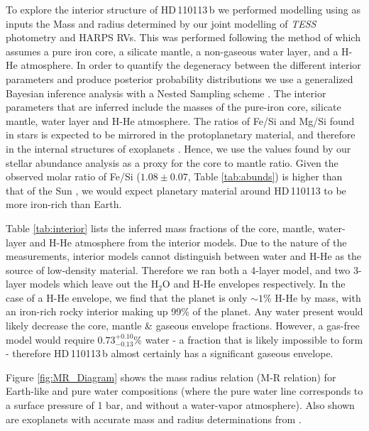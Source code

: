 \documentclass[fleqn,usenatbib]{mnras}
\newcommand{\tess}{{\it TESS}}
\newcommand{\harps}{{HARPS}}
\newcommand{\Tstar}{HD\,110113}
\newcommand{\Tplanet}{HD\,110113\,b}
\begin{document}
To explore the interior structure of \Tplanet{} we performed modelling using as inputs the Mass and radius determined by our joint modelling of \tess{} photometry and \harps{} RVs.
This was performed following the method of \citet{otegi2020revisited} which assumes a pure iron core, a silicate mantle, a non-gaseous water layer, and a H-He atmosphere.
In order to quantify the degeneracy between the different interior parameters and produce posterior probability distributions we use a generalized Bayesian inference analysis with a Nested Sampling scheme \citep[e.g.][]{2014A&A...564A.125B}.
The interior parameters that are inferred include the masses of the pure-iron core, silicate mantle, water layer and H-He atmosphere.
The ratios of Fe/Si and Mg/Si found in stars is expected to be mirrored in the protoplanetary material, and therefore in the internal structures of exoplanets \citep{thiabaud2015elemental}.
Hence, we use the values found by our stellar abundance analysis as a proxy for the core to mantle ratio.
Given the observed molar ratio of Fe/Si ($1.08\pm0.07$, Table \ref{tab:abunds}) is higher than that of the Sun  \citep[0.86][]{thiabaud2015elemental}, we would expect planetary material around \Tstar{} to be more iron-rich than Earth.

Table \ref{tab:interior} lists the inferred mass fractions of the core, mantle, water-layer and H-He atmosphere from the interior models.
Due to the nature of the measurements, interior models cannot distinguish between water and H-He as the source of low-density material. 
Therefore we ran both a 4-layer model, and two 3-layer models which leave out the H$_{2}$O and H-He envelopes respectively.
In the case of a H-He envelope, we find that the planet is only $\sim1$\% H-He by mass, with an iron-rich rocky interior making up 99\% of the planet.
Any water present would likely decrease the core, mantle \& gaseous envelope fractions. 
However, a gas-free model would require $0.73 ^{+0.10} _{-0.13}$\% water - a fraction that is likely impossible to form - therefore \Tplanet{} almost certainly has a significant gaseous envelope.

Figure \ref{fig:MR_Diagram} shows the mass radius relation (M-R relation) for Earth-like and pure water compositions (where the pure water line corresponds to a surface pressure of 1 bar, and without a water-vapor atmosphere).
Also shown are exoplanets with accurate mass and radius determinations from \citet{otegi2020revisited}.
\end{document}
